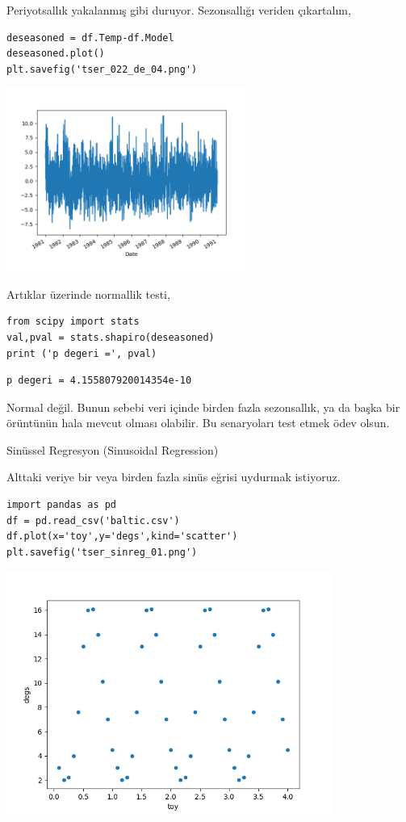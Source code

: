 \documentclass[12pt,fleqn]{article}\usepackage{../../common}
\begin{document}
Periyotsallık yakalanmış gibi duruyor. Sezonsallığı veriden çıkartalım,

\begin{verbatim}
deseasoned = df.Temp-df.Model
deseasoned.plot()
plt.savefig('tser_022_de_04.png')
\end{verbatim}

\includegraphics[height=6cm]{tser_022_de_04.png}

Artıklar üzerinde normallik testi,

\begin{verbatim}
from scipy import stats
val,pval = stats.shapiro(deseasoned)
print ('p degeri =', pval)
\end{verbatim}

\begin{verbatim}
p degeri = 4.155807920014354e-10
\end{verbatim}

Normal değil. Bunun sebebi veri içinde birden fazla sezonsallık, ya da başka bir
örüntünün hala mevcut olması olabilir. Bu senaryoları test etmek ödev olsun.

Sinüssel Regresyon (Sinusoidal Regression)

Alttaki veriye bir veya birden fazla sinüs eğrisi uydurmak istiyoruz. 

\begin{verbatim}
import pandas as pd
df = pd.read_csv('baltic.csv')
df.plot(x='toy',y='degs',kind='scatter')
plt.savefig('tser_sinreg_01.png')
\end{verbatim}

\includegraphics[height=8cm]{tser_sinreg_01.png}
\end{document}
